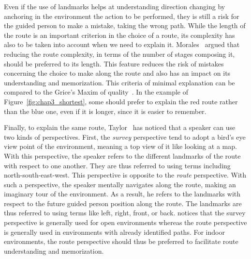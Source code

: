 Even if the use of landmarks helps at understanding direction changing by anchoring in the environment the action to be performed, they is still a risk for the guided person to make a mistake, taking the wrong path. While the length of the route is an important criterion in the choice of a route, its complexity has also to be taken into account when we need to explain it. Morales~\cite{morales_2015_building} argued that reducing the route complexity, in terms of the number of stages composing it, should be preferred to its length. This feature reduces the risk of mistakes concerning the choice to make along the route and also has an impact on its understanding and memorization. This criteria of minimal explanation can be compared to the Grice's Maxim of quality~\cite{grice_1975_logic}. In the example of Figure~\ref{fig:chap3_shortest}, some should prefer to explain the red route rather than the blue one, even if it is longer, since it is easier to remember.

Finally, to explain the same route, Taylor~\cite{taylor_1992_spatial} has noticed that a speaker can use two kinds of perspectives. First, the \textit{survey} perspective tend to adopt a bird's eye view point of the environment, meaning a top view of it like looking at a map. With this perspective, the speaker refers to the different landmarks of the route with respect to one another. They are thus referred to using terms including north-south-east-west. This perspective is opposite to the \textit{route} perspective. With such a perspective, the speaker mentally navigates along the route, making an imaginary tour of the environment. As a result, he refers to the landmarks with respect to the future guided person position along the route. The landmarks are thus referred to using terms like left, right, front, or back. \cite{taylor_1996_perspective} notices that the survey perspective is generally used for open environments whereas the route perspective is generally used in environments with already identified paths. For indoor environments, the route perspective should thus be preferred to facilitate route understanding and memorization.



